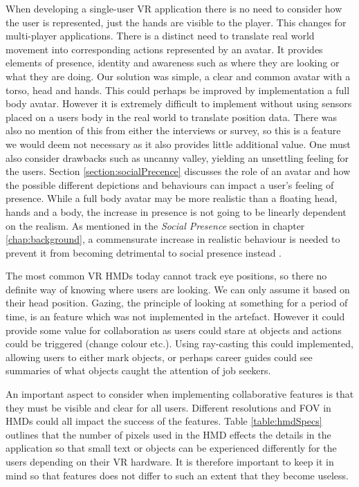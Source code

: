 When developing a single-user VR application there is no need to consider how the user is represented, just the hands are visible to the player. This changes for multi-player applications. There is a distinct need to translate real world movement into corresponding actions represented by an avatar. It provides elements of presence, identity and awareness such as where they are looking or what they are doing. Our solution was simple, a clear and common avatar with a torso, head and hands. This could perhaps be improved by implementation a full body avatar. However it is extremely difficult to implement without using sensors placed on a users body in the real world to translate position data. There was also no mention of this from either the interviews or survey, so this is a feature we would deem not necessary as it also provides little additional value. One must also consider drawbacks such as uncanny valley, yielding an unsettling feeling for the users. Section \ref{section:socialPrecence} discusses the role of an avatar and how the possible different depictions and behaviours can impact a user's feeling of presence. While a full body avatar may be more realistic than a floating head, hands and a body, the increase in presence is not going to be linearly dependent on the realism. As mentioned in the \textit{Social Presence} section in chapter \ref{chap:background}, a commensurate increase in realistic behaviour is needed to prevent it from becoming detrimental to social presence instead \cite{oh2018systematic}. 

The most common VR HMDs today cannot track eye positions, so there no definite way of knowing where users are looking. We can only assume it based on their head position. Gazing, the principle of looking at something for a period of time, is an feature which was not implemented in the artefact. However it could provide some value for collaboration as users could stare at objects and actions could be triggered (change colour etc.). Using ray-casting this could implemented, allowing users to either mark objects, or perhaps career guides could see summaries of what objects caught the attention of job seekers. 

An important aspect to consider when implementing collaborative features is that they must be visible and clear for all users. Different resolutions and FOV in HMDs could all impact the success of the features. Table \ref{table:hmdSpecs} outlines that the number of pixels used in the HMD effects the details in the application so that small text or objects can be experienced differently for the users depending on their VR hardware. It is therefore important to keep it in mind so that features does not differ to such an extent that they become useless.


